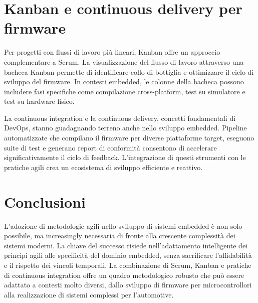 \documentclass[
    language=italian,
    doctype=article,
]{../../omnilatex}
\begin{document}
\section{Kanban e continuous delivery per firmware}
Per progetti con flussi di lavoro più lineari, Kanban offre un approccio complementare a Scrum. La visualizzazione del flusso di lavoro attraverso una bacheca Kanban permette di identificare collo di bottiglia e ottimizzare il ciclo di sviluppo del firmware. In contesti embedded, le colonne della bacheca possono includere fasi specifiche come compilazione cross-platform, test su simulatore e test su hardware fisico.

La continuous integration e la continuous delivery, concetti fondamentali di DevOps, stanno guadagnando terreno anche nello sviluppo embedded. Pipeline automatizzate che compilano il firmware per diverse piattaforme target, eseguono suite di test e generano report di conformità consentono di accelerare significativamente il ciclo di feedback. L'integrazione di questi strumenti con le pratiche agili crea un ecosistema di sviluppo efficiente e reattivo.

\section{Conclusioni}
L'adozione di metodologie agili nello sviluppo di sistemi embedded è non solo possibile, ma increasingly necessaria di fronte alla crescente complessità dei sistemi moderni. La chiave del successo risiede nell'adattamento intelligente dei principi agili alle specificità del dominio embedded, senza sacrificare l'affidabilità e il rispetto dei vincoli temporali. La combinazione di Scrum, Kanban e pratiche di continuous integration offre un quadro metodologico robusto che può essere adattato a contesti molto diversi, dallo sviluppo di firmware per microcontrollori alla realizzazione di sistemi complessi per l'automotive.
\end{document}
